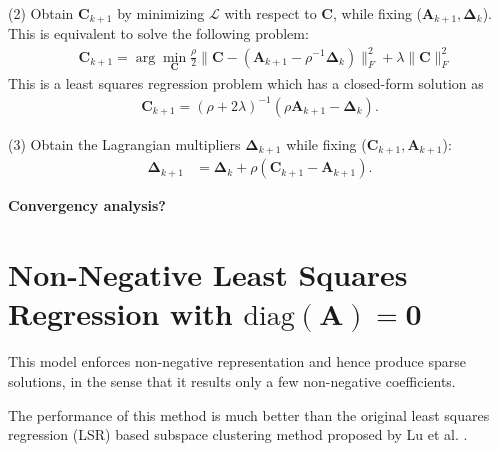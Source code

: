 \documentclass[10pt,twocolumn,letterpaper]{article}
\begin{document}
(2) Obtain $\bm{C}_{k+1}$ by minimizing $\mathcal{L}$ with respect to $\bm{C}$, while fixing ($\bm{A}_{k+1},\bm{\Delta}_{k}$). This is equivalent to solve the following problem:
\begin{equation}
\begin{split}
\label{e8}
&
\bm{C}_{k+1}
=
\arg\min_{\bm{C}}
\frac{\rho}{2}
\|
\bm{C}-(\bm{A}_{k+1}-\rho^{-1}\bm{\Delta}_{k})
\|_{F}^{2}
+
\lambda
\|
\bm{C}
\|_{F}^{2}
\end{split}
\end{equation}
This is a least squares regression problem which has a closed-form solution as 
\begin{equation}
\begin{split}
\label{e9}
\bm{C}_{k+1} 
=
(\rho+2\lambda)^{-1}(\rho\bm{A}_{k+1}-\bm{\Delta}_{k}).
\end{split}
\end{equation}

(3) Obtain the Lagrangian multipliers $\bm{\Delta}_{k+1}$ while fixing ($\bm{C}_{k+1},\bm{A}_{k+1}$):
\begin{equation}
\begin{split}
\label{e10}
\bm{\Delta}_{k+1}
&
=
\bm{\Delta}_{k}
+
\rho
(\bm{C}_{k+1}-\bm{A}_{k+1})
.
\end{split}
\end{equation}

\textbf{Convergency analysis?}

\section{Non-Negative Least Squares Regression with $\text{diag}(\bm{A})=\bm{0}$}

This model enforces non-negative representation and hence produce sparse solutions, in the sense that it results only a few non-negative coefficients.

The performance of this method is much better than the original least squares regression (LSR) based subspace clustering method proposed by Lu et al. \cite{lsr}.
\end{document}
